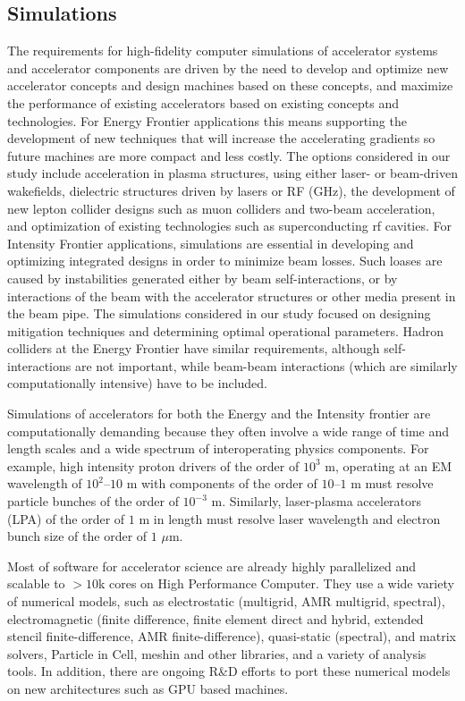 \subsection{Simulations} \label{subsec:accel-simu}
The requirements for high-fidelity computer simulations of accelerator systems and accelerator components are driven by the need to develop and optimize new accelerator concepts and design machines based on these concepts, and maximize the performance of existing accelerators based on existing concepts and technologies.  For  Energy Frontier applications this means supporting the development of new techniques that will increase the accelerating gradients so future machines are more compact and less costly. The options considered in our study include acceleration in plasma structures, using either laser- or beam-driven wakefields, dielectric structures driven by lasers or RF (GHz), the development of new lepton collider designs such as muon colliders and two-beam acceleration, and optimization of existing technologies such as superconducting rf cavities. For  Intensity Frontier applications, simulations are essential in developing and optimizing integrated designs in order to minimize beam losses.  Such loases are caused by instabilities generated either by beam self-interactions, or by interactions of the beam with the accelerator structures or other media present in the beam pipe.  The simulations considered in our study focused on designing mitigation techniques and determining optimal operational parameters.  Hadron colliders at the Energy Frontier have similar requirements, although self-interactions are not important, while beam-beam interactions (which are similarly computationally intensive) have to be included.  

Simulations of accelerators for both the Energy and the Intensity frontier are computationally demanding because they often involve a wide range of time and length scales and a wide spectrum of interoperating physics components. For example, high intensity proton drivers of the order of $10^3$ m, operating at an EM wavelength of $10^2$--$10$ m with components of the order of $10$--$1$ m must resolve particle bunches of the order of $10^{-3}$ m. Similarly, laser-plasma accelerators (LPA) of the order of $1$ m in length must resolve laser wavelength and electron bunch size of the order of $1$ $\mu$m.

Most of software for accelerator science are already  highly parallelized and scalable to $> 10$k cores on High Performance Computer. They use a wide variety of numerical models, such as electrostatic (multigrid, AMR multigrid, spectral), electromagnetic (finite difference, finite element direct and hybrid, extended stencil finite-difference, AMR finite-difference), quasi-static (spectral), and  matrix solvers, Particle in Cell, meshin and other libraries, and a variety of analysis tools. In addition, there are ongoing R\&D efforts to port these numerical models on new architectures such as GPU based machines.

